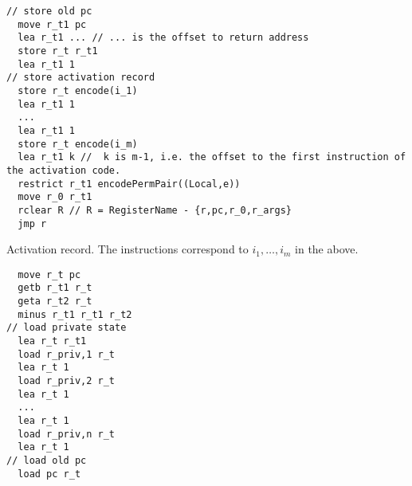 \documentclass[a4paper]{article}
\begin{document}
\begin{description}
\begin{lstlisting}
// store old pc
  move r_t1 pc
  lea r_t1 ... // ... is the offset to return address
  store r_t r_t1
  lea r_t1 1
// store activation record
  store r_t encode(i_1)
  lea r_t1 1
  ...
  lea r_t1 1  
  store r_t encode(i_m)
  lea r_t1 k //  k is m-1, i.e. the offset to the first instruction of the activation code.
  restrict r_t1 encodePermPair((Local,e))
  move r_0 r_t1
  rclear R // R = RegisterName - {r,pc,r_0,r_args}
  jmp r
\end{lstlisting}
Activation record. The instructions correspond to $i_1,\dots,i_m$ in the above.
\begin{lstlisting}
  move r_t pc
  getb r_t1 r_t
  geta r_t2 r_t
  minus r_t1 r_t1 r_t2
// load private state
  lea r_t r_t1
  load r_priv,1 r_t
  lea r_t 1
  load r_priv,2 r_t
  lea r_t 1
  ...
  lea r_t 1
  load r_priv,n r_t
  lea r_t 1
// load old pc
  load pc r_t
\end{lstlisting}
 

\end{description}
\end{document}
